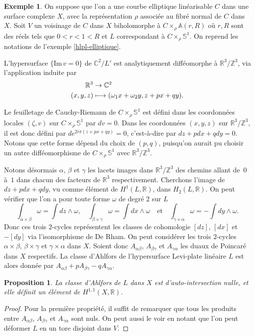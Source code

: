 \documentclass[JEP,XML,SOM,Unicode,francais,published]{cedram}
\newcommand\mto{\mathchoice{\longmapsto}{\mapsto}{\mapsto}{\mapsto}}
\newcommand{\Z}{\mathbb{Z}}
\newcommand{\R}{\mathbb{R}}
\newcommand{\C}{\mathbb{C}}
\newtheorem{prop}[thm]{Proposition}
\theoremstyle{definition}
\newtheorem{exemple}[thm]{Exemple}
\begin{document}
\begin{exemple}
\label{ex-ahlfors}
On suppose que l'on a une courbe elliptique linéarisable $C$ dans une surface complexe $X$, avec la représentation $\rho$ associée au fibré normal de $C$ dans $X$. Soit $V$ un voisinage de $C$ dans $X$ biholomorphe à $C \times_\rho \mathbb{A}(r, R)$ où $r, R$ sont des réels tels que $0 < r < 1 < R$ et $L$ correspondant à $C \times_\rho \mathbb{S}^1$. On reprend les notations de l'exemple \ref{hlpl-elliptique}.

L'hypersurface $\{\mathrm{Im}\,v = 0\}$ de $\C^2/L'$ est analytiquement difféomorphe à $\R^3/\Z^3$, via l'application induite par
\begin{align*}
\R^3 &\to \C^2\\
(x, y, z) &\mto (\omega_1 x + \omega_2 y, z + px + qy).
\end{align*}

Le feuilletage de Cauchy-Riemann de $C\times_\rho \mathbb{S}^1$ est défini dans les coordonnées locales $(\zeta, v)$ sur $C\times_\rho \mathbb{S}^1$ par $dv = 0$. Dans les coordonnées $(x, y, z)$ sur $\R^3/\Z^3$, il est donc défini par $de^{2i\pi(z + px + qy)} = 0$, c'est-à-dire par $dz + pdx + qdy = 0$. Notons que cette forme dépend du choix de $(p, q)$, puisqu'on aurait pu choisir un autre difféomorphisme de $C \times_\rho \mathbb{S}^1$ avec $\R^3/\Z^3$.

Notons désormais $\alpha$, $\beta$ et $\gamma$ les lacets images dans $\R^3/\Z^3$ des chemins allant de~$0$ à~$1$ dans chacun des facteurs de $\R^3$ respectivement.
Cherchons l'image de $dz + pdx +qdy$, vu comme élément de $H^1(L, \R)$, dans $H_2(L, \R)$. On peut vérifier que l'on a pour toute forme $\omega$ de degré $2$ sur $L$
\[
\int_{\alpha\times\beta} \omega = \int dz \wedge \omega, \quad
\int_{\beta\times\gamma} \omega = \int dx \wedge \omega\quad\text{et}\quad\int_{\gamma\times\alpha} \omega = -\int dy\wedge \omega.
\]
Donc ces trois $2$-cycles représentent les classes de cohomologie $[dz]$, $[dx]$ et $-[dy]$ via l'isomorphisme de De Rham.
On peut considérer les trois $2$-cycles $\alpha\times\beta$, $\beta\times\gamma$ et $\gamma\times\alpha$ dans $X$. Soient donc $A_{\alpha\beta}$, $A_{\beta\gamma}$ et $A_{\gamma\alpha}$ les duaux de Poincaré dans $X$ respectifs.
La classe d'Ahlfors de l'hypersurface Levi-plate linéaire $L$ est alors donnée par $A_{\alpha\beta} + pA_{\beta\gamma} - qA_{\gamma\alpha}$.

\begin{prop}
\label{prop-classe-ahlfors}
La classe d'Ahlfors de $L$ dans $X$ est d'auto-intersection nulle, et elle définit un élément de $H^{1, 1}(X, \R)$.
\end{prop}
\begin{proof}Pour la première propriété, il suffit de remarquer que tous les produits entre $A_{\alpha\beta}$, $A_{\beta\gamma}$ et $A_{\gamma\alpha}$ sont nuls. On peut aussi le voir en notant que l'on peut déformer $L$ en un tore disjoint dans $V$.


\end{proof}
\end{exemple}
\end{document}
